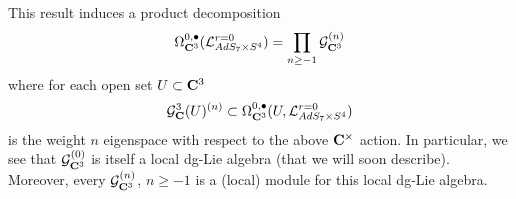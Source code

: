 \documentclass[../main.tex]{subfiles}
\begin{document}
 
This result induces a product decomposition 
\begin{equation}
\label{eqn:Gdecomp}
\Omega^{0,\bullet}_{\mathbf{C}^3} (\mathcal{L}^{{r=0}}_{AdS_7\times S^4}) = \prod_{n \geq -1} \mathcal{G}_{\mathbf{C}^3}^{(n)}
\end{equation}
where for each open set $U \subset \mathbf{C}^3$
\[
\mathcal{G}_{\mathbf{C}}^3(U)^{(n)}\subset \Omega^{0,\bullet}_{\mathbf{C}^3} (U, \mathcal{L}^{{r=0}}_{AdS_7\times S^4} )
\]
is the weight $n$ eigenspace with respect to the above $\mathbf{C}^\times$ action.  In particular, we see that $\mathcal{G}^{(0)}_{\mathbf{C}^3}$ is itself a local dg-Lie algebra (that we will soon describe). 
Moreover, every $\mathcal{G}_{\mathbf{C}^3}^{(n)}$, $n \geq -1$ is a (local) module for this local dg-Lie algebra.

\end{document}
